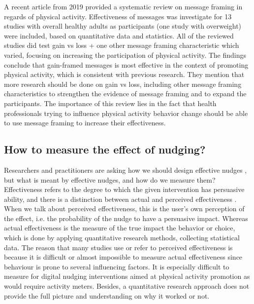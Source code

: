 A recent article from 2019 
\cite{williams_effects_2019}
provided a systematic review on message framing in regards of physical activity. Effectiveness of messages was investigate for 13 studies with overall healthy adults as participants (one study with overweight) were included, based on quantitative data and statistics. All of the reviewed studies did test gain vs loss + one other message framing characteristic which varied, focusing on increasing the participation of physical activity. The findings conclude that gain-framed messages is most effective in the context of promoting physical activity, which is consistent with previous research. They mention that more research should be done on gain vs loss, including other message framing characteristics to strengthen the evidence of message framing and to expand the participants.
The importance of this review lies in the fact that health professionals trying to influence physical activity behavior change should be able to use message framing to increase their effectiveness.

\subsection{How to measure the effect of nudging?}
Researchers and practitioners are asking how we should design effective nudges 
\cite{purohit_functional_2019},
but what is meant by effective nudges, and how do we measure them? Effectiveness refers to the degree to which the given intervention has persuasive ability, and there is a distinction between actual and perceived effectiveness 
\cite{dillard_relationship_2007}.
When we talk about perceived effectiveness, this is the user's own perception of the effect, i.e. the probability of the nudge to have a persuasive impact. Whereas actual effectiveness is the measure of the true impact the behavior or choice, which is done by applying quantitative research methods, collecting statistical data. The reason that many studies use or refer to perceived effectiveness is because it is difficult or almost impossible to measure actual effectiveness since behaviour is prone to several influencing factors. It is especially difficult to measure for digital nudging interventions aimed at physical activity promotion as would require activity meters. Besides, a quantitative research approach does not provide the full picture and understanding on why it worked or not. 


